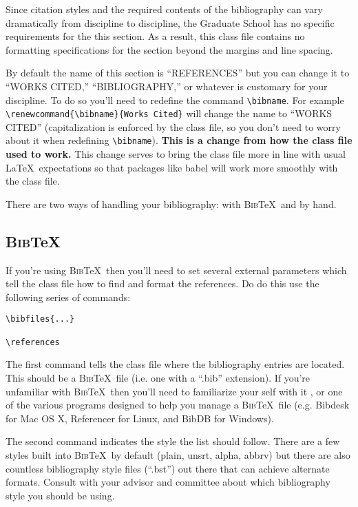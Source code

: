 Since citation styles and the required contents of the bibliography can vary dramatically from discipline to discipline, the Graduate School has no specific requirements for the this section.  As a result, this class file contains no formatting specifications for the section beyond the margins and line spacing.

By default the name of this section is ``REFERENCES'' but you can change it to ``WORKS CITED,'' ``BIBLIOGRAPHY,'' or whatever is customary for your discipline.  To do so you'll need to redefine the command \verb=\bibname=.  For example \verb=\renewcommand{\bibname}{Works Cited}= will change the name to ``WORKS CITED'' (capitalization is enforced by the class file, so you don't need to worry about it when redefining \verb=\bibname=).  \textbf{This is a change from how the class file used to work.}  This change serves to bring the class file more in line with usual \LaTeX\ expectations so that packages like babel will work more smoothly with the class file.

There are two ways of handling your bibliography: with \textsc{Bib}\TeX\ and by hand.

\subsection{\textsc{Bib}\TeX}
If you're using \textsc{Bib}\TeX\ then you'll need to set several external parameters which tell the class file how to find and format the references.  Do do this use the following series of commands:

\begin{verbatim}
\bibfiles{...}

\references
\end{verbatim}

The first command tells the class file where the bibliography entries are located.  This should be a \textsc{Bib}\TeX\ file (i.e. one with a ``.bib'' extension).  If you're unfamiliar with \textsc{Bib}\TeX\ then you'll need to familiarize your self with it \citep{Feder:2006}, or one of the various programs designed to help you manage a \textsc{Bib}\TeX\ file (e.g. Bibdesk \citep{BibDesk} for Mac OS X, Referencer \citep{Spray:2007} for Linux, and BibDB \citep{Doron:1999} for Windows).

The second command indicates the style the list should follow.  There are a few styles built into \textsc{Bib}\TeX\ by default (plain, unsrt, alpha, abbrv) but there are also countless bibliography style files (``.bst'') out there that can achieve alternate formats.  Consult with your advisor and committee about which bibliography style you should be using.

